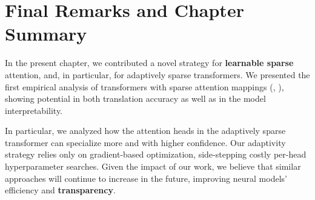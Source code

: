 \section{Final Remarks and Chapter Summary}

In the present chapter, we contributed a novel strategy for
\textbf{learnable sparse} attention, and, in particular, for adaptively
sparse transformers. We presented the first empirical analysis of
transformers with sparse attention mappings (\ie, \entmaxtext),
showing potential in both translation accuracy as well as in the model
interpretability.

In particular, we analyzed how the attention heads in the adaptively
sparse transformer can specialize more and with higher confidence.
Our adaptivity strategy relies only on gradient-based optimization,
side-stepping costly per-head hyperparameter searches. Given the
impact of our work, we believe that similar approaches will continue
to increase in the future, improving neural
models' efficiency and \textbf{transparency}.

\cleardoublepage

\singlespacing